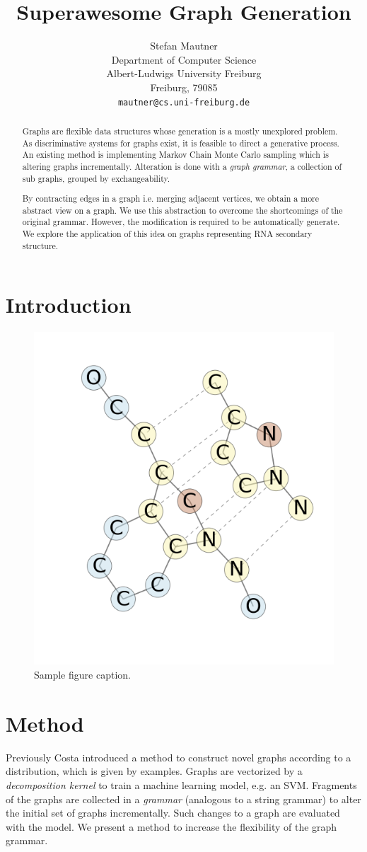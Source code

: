 \documentclass{article}
\title{Superawesome Graph Generation}
\author{
  Stefan Mautner\\
  Department of Computer Science\\
  Albert-Ludwigs University Freiburg\\
  Freiburg, 79085  \\
  \texttt{mautner@cs.uni-freiburg.de} \\
}
\begin{document}

\maketitle

\begin{abstract}
 
Graphs are flexible data structures whose generation 
is a mostly unexplored problem. As discriminative systems for graphs
exist, it is feasible to direct a generative process.
An existing method is implementing Markov Chain Monte Carlo 
sampling which is altering graphs incrementally.
Alteration is done with a \emph{graph grammar}, a collection
of sub graphs, grouped by exchangeability.

By contracting edges in a graph i.e. merging adjacent vertices,
we obtain a more abstract view on a graph. 
We use this abstraction to overcome the shortcomings of the original 
grammar.
However, the modification is required to be automatically generate. 
We explore the application of this idea
on graphs representing RNA secondary structure. 




\end{abstract}
\section{Introduction}


% 
\begin{figure}[ht]
      \centering
        \includegraphics[width=0.2\linewidth]{images/cip.png}
      \caption{Sample figure caption.}
      \label{nazis}
\end{figure}

\section{Method}
Previously Costa \cite{costa14} introduced a method
to construct novel graphs according to a distribution, which is given by
examples. Graphs are vectorized by a \emph{decomposition kernel}
to train a machine learning model, e.g. an SVM.
Fragments of the graphs are collected in 
a \emph{grammar} (analogous to a string grammar) to alter the initial
set of graphs incrementally. Such changes to a graph are evaluated with the
model. 
We present a method to increase the flexibility of the graph grammar.
\end{document}
